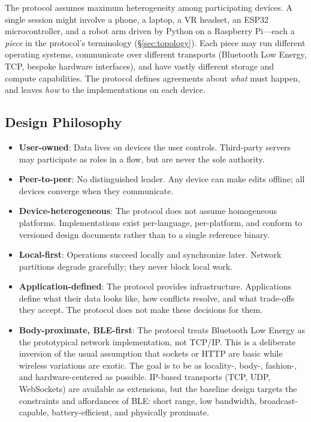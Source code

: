 \documentclass[11pt, letterpaper]{article}
\begin{document}
The protocol assumes maximum heterogeneity among participating devices. A single session
might involve a phone, a laptop, a VR headset, an ESP32 microcontroller, and a robot arm
driven by Python on a Raspberry Pi---each a \emph{piece} in the protocol's terminology
(\S\ref{sec:topology}). Each piece may run different operating systems,
communicate over different transports (Bluetooth Low Energy, TCP, bespoke hardware
interfaces), and have vastly different storage and compute capabilities. The protocol
defines agreements about \emph{what} must happen, and leaves \emph{how} to the
implementations on each device.

\subsection{Design Philosophy}

\begin{itemize}[leftmargin=2em]
  \item \textbf{User-owned}: Data lives on devices the user controls. Third-party
    servers may participate as roles in a flow, but are never the sole authority.
  \item \textbf{Peer-to-peer}: No distinguished leader. Any device can make edits
    offline; all devices converge when they communicate.
  \item \textbf{Device-heterogeneous}: The protocol does not assume homogeneous
    platforms. Implementations exist per-language, per-platform, and conform to
    versioned design documents rather than to a single reference binary.
  \item \textbf{Local-first}: Operations succeed locally and synchronize later.
    Network partitions degrade gracefully; they never block local work.
  \item \textbf{Application-defined}: The protocol provides infrastructure. Applications
    define what their data looks like, how conflicts resolve, and what trade-offs they
    accept. The protocol does not make these decisions for them.
  \item \textbf{Body-proximate, BLE-first}: The protocol treats Bluetooth Low Energy as
    the prototypical network implementation, not TCP/IP. This is a deliberate inversion
    of the usual assumption that sockets or HTTP are basic while wireless variations are
    exotic. The goal is to be as locality-, body-, fashion-, and hardware-centered as
    possible. IP-based transports (TCP, UDP, WebSockets) are available as extensions, but
    the baseline design targets the constraints and affordances of BLE: short range,
    low bandwidth, broadcast-capable, battery-efficient, and physically proximate.
\end{itemize}
\end{document}
